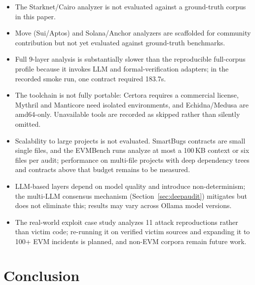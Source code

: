 \documentclass[conference]{IEEEtran}
\begin{document}
\begin{itemize}
    \item The Starknet/Cairo analyzer is not evaluated against a ground-truth corpus in this paper.
    \item Move (Sui/Aptos) and Solana/Anchor analyzers are scaffolded for community contribution but not yet evaluated against ground-truth benchmarks.
    \item Full 9-layer analysis is substantially slower than the reproducible full-corpus profile because it invokes LLM and formal-verification adapters; in the recorded smoke run, one contract required 183.7s.
    \item The toolchain is not fully portable: Certora requires a commercial license, Mythril and Manticore need isolated environments, and Echidna/Medusa are amd64-only. Unavailable tools are recorded as skipped rather than silently omitted.
    \item Scalability to large projects is not evaluated. SmartBugs contracts are small single files, and the EVMBench runs analyze at most a 100\,KB context or six files per audit; performance on multi-file projects with deep dependency trees and contracts above that budget remains to be measured.
    \item LLM-based layers depend on model quality and introduce non-determinism; the multi-LLM consensus mechanism (Section~\ref{sec:deepaudit}) mitigates but does not eliminate this; results may vary across Ollama model versions.
    \item The real-world exploit case study analyzes 11 attack reproductions rather than victim code; re-running it on verified victim sources and expanding it to 100+ EVM incidents is planned, and non-EVM corpora remain future work.
\end{itemize}

\section{Conclusion}
\end{document}
